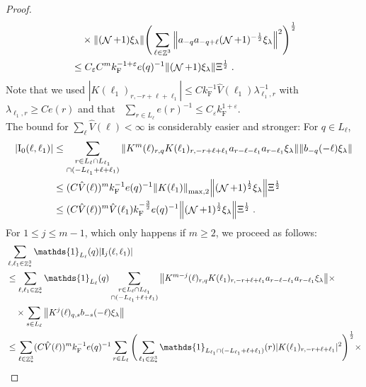 \documentclass[12pt,a4paper]{article}
\numberwithin{equation}{section}
\newcommand{\1}{\mathbb{I}}
\newcommand{\F}{\mathrm{F}}
\newcommand{\I}{\mathrm{I}}
\DeclareMathOperator{\Z}{\mathbb{Z}}
\DeclareMathOperator{\NN}{\mathcal{N}}
\newcommand{\half}{\frac{1}{2}}
\theoremstyle{plain}
\theoremstyle{definition}
\theoremstyle{remark}
\theoremstyle{plain}
\theoremstyle{definition}
\theoremstyle{remark}
\begin{document}
\begin{proof}
{\begin{align}
	&\quad \times \norm{(\NN+1) \xi_\lambda}
		\Bigg( \sum_{\ell \in \Z^3} \norm{ a_{-q} a_{-q+\ell} (\NN+1)^{-\half} \xi_\lambda}^2 \Bigg)^{\half} \nonumber\\
	&\leq C_\varepsilon C^m k_{\F}^{-1 + \varepsilon} e(q)^{-1}
		\norm{ (\NN+1) \xi_\lambda } \Xi^{\half} \;. \label{eq:estEQ2151_Coulomb}
\end{align}
Note that we used $ |K(\ell_1)_{r,-r+\ell+\ell_1}| \le C k_{\F}^{-1} \hat{V}(\ell_1) \lambda_{\ell_1,r}^{-1} $ with $ \lambda_{\ell_1,r} \ge C e(r) $ and that~\cite[Lemma~3.2]{CHN24} $ \sum_{r \in L_\ell} e(r)^{-1} \le C_\varepsilon k_{\F}^{1+\varepsilon} $.\\
The bound for $ \sum_{\ell} \hat{V}(\ell) < \infty $ is considerably easier and stronger: For $ q \in L_\ell $,
}
\begin{align}
	|\I_0(\ell, \ell_1)|
	&\leq \sum\limits_{\substack{r\in L_{\ell} \cap L_{\ell_1} \\ \cap (-L_{\ell_1}+\ell+\ell_1)}} \norm{K^m(\ell)_{r,q} K(\ell_1)_{r,-r+\ell+\ell_1} a_{r-\ell-\ell_1} a_{r-\ell_1} \xi_\lambda}\norm{ b_{-q}(-\ell) \xi_\lambda}\nonumber\\
	&\leq (C \hat{V}(\ell))^m k_{\F}^{-1} e(q)^{-1}
		\norm{K(\ell_1)}_{\max,2} \norm{ (\NN+1)^\half \xi_\lambda } \Xi^{\half} \nonumber\\
	&\leq (C \hat{V}(\ell))^m
		\hat{V}(\ell_1)
		k_{\F}^{-\frac 32} e(q)^{-1}
		\norm{ (\NN+1)^\half \xi_\lambda } \Xi^{\half} \;. \label{eq:estEQ2151}
\end{align}
\textcolor{green!30!black}{
For $ 1 \le j \le m-1 $, which only happens if $ m \ge 2 $, we proceed as follows:
\begin{align}
	&\sum_{\ell,\ell_1 \in \Z^3_*} \mathds{1}_{L_\ell}(q) |\I_j(\ell, \ell_1)| \nonumber\\
	&\leq \sum_{\ell,\ell_1 \in \Z^3_*} \mathds{1}_{L_\ell}(q) \sum\limits_{\substack{r\in L_{\ell} \cap L_{\ell_1}\\ \cap (-L_{\ell_1}+\ell+\ell_1)}}
		\norm{ K^{m-j}(\ell)_{r,q} K(\ell_1)_{r,-r+\ell+\ell_1} a_{r-\ell-\ell_1} a_{r-\ell_1} \xi_\lambda} \times \nonumber\\
	&\quad \times \sum\limits_{s \in L_{\ell}}
		\norm{ K^j(\ell)_{q,s} b_{-s}(-\ell) \xi_\lambda }\nonumber\\
	&\leq \sum_{\ell \in \Z^3_*} (C \hat{V}(\ell))^m k_{\F}^{-1} e(q)^{-1}
		\sum_{r \in L_\ell}
		\Bigg( \sum_{\ell_1 \in \Z^3_*} \mathds{1}_{L_{\ell_1} \cap (-L_{\ell_1}+\ell+\ell_1) }(r) |K(\ell_1)_{r,-r+\ell+\ell_1}|^2 \Bigg)^{\half} \times \nonumber\\

\end{align}}
\end{proof}
\end{document}
